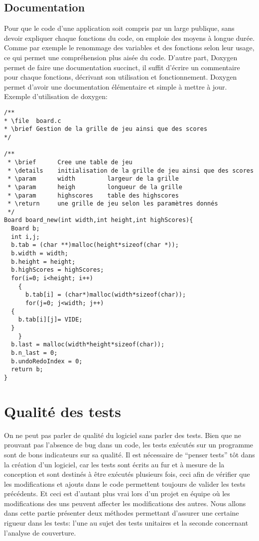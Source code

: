 \documentclass{report}
\begin{document}
\section{Documentation}
Pour que le code d'une application soit compris par un large publique, sans devoir expliquer chaque fonctions du code, on emploie des moyens à longue durée. Comme par exemple le renommage des variables et des fonctions selon leur usage, ce qui permet une compréhension plus aisée du code. D'autre part, Doxygen permet de faire une documentation succinct, il suffit d'écrire un commentaire pour chaque fonctions, décrivant son utilisation et fonctionnement. Doxygen permet d'avoir une documentation élémentaire et simple à mettre à jour.
Exemple d'utilisation de doxygen:
\begin{scriptsize}
\begin{lstlisting}
/**
* \file  board.c
* \brief Gestion de la grille de jeu ainsi que des scores 
*/

/**
 * \brief      Cree une table de jeu
 * \details    initialisation de la grille de jeu ainsi que des scores
 * \param      width         largeur de la grille
 * \param      heigh         longueur de la grille
 * \param      highscores    table des highscores
 * \return     une grille de jeu selon les paramètres donnés
 */
Board board_new(int width,int height,int highScores){
  Board b;
  int i,j;
  b.tab = (char **)malloc(height*sizeof(char *));
  b.width = width;
  b.height = height;
  b.highScores = highScores;
  for(i=0; i<height; i++)
    {
      b.tab[i] = (char*)malloc(width*sizeof(char));
      for(j=0; j<width; j++)
  {
    b.tab[i][j]= VIDE;
  }
    }
  b.last = malloc(width*height*sizeof(char));
  b.n_last = 0;
  b.undoRedoIndex = 0;
  return b;
}

\end{lstlisting}
\end{scriptsize}

\chapter{Qualité des tests}
On ne peut pas parler de qualité du logiciel sans parler des tests. Bien que ne prouvant pas l'absence de bug dans un code, les tests exécutés sur un programme sont de bons indicateurs sur sa qualité. Il est nécessaire de ``penser tests'' tôt dans la création d'un logiciel, car les tests sont écrits au fur et à mesure de la conception et sont destinés à être exécutés plusieurs fois, ceci afin de vérifier que les modifications et ajouts dans le code permettent toujours de valider les tests précédents. Et ceci est d'autant plus vrai lors d'un projet en équipe où les modifications des uns peuvent affecter les modifications des autres. Nous allons dans cette partie présenter deux méthodes permettant d'assurer une certaine rigueur dans les tests: l'une au sujet des tests unitaires et la seconde concernant l'analyse de couverture.
\end{document}
